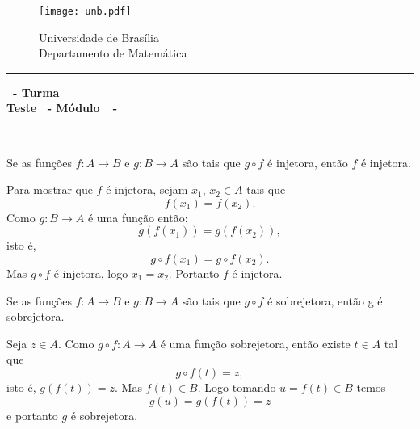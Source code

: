 \documentclass[12pt]{exam}
\begin{document}
    \begin{figure}[h]
        \begin{minipage}[c]{1.7cm}
            \texttt{[image: unb.pdf]}
        \end{minipage}
        \hspace{0pt}
        \begin{minipage}[c]{4in}
            {Universidade de Brasília} \\
            {Departamento de Matemática}
        \end{minipage}
    \end{figure}
    \hrule
    \begin{center}
        {\Large\bf \disciplina\ - Turma \turma}  \\
         {\large\bf Teste \numeroteste\ - Módulo\ \modulo\ -\ \dataavaliacao}
    \end{center}

    \\
    \vspace*{.01cm}

    \vspace{.4cm}

    \questao Se as funções $f : A \to B$ e $g : B\to A$ são
    tais que $g\circ f$ é injetora, então $f$ é injetora.

    \noindent\solucao Para mostrar que $f$ é injetora, sejam $x_1$, $x_2 \in A$ tais que
    \[
        f(x_1) = f(x_2).
    \]
    Como $g : B \to A$ é uma função então:
    \[
        g(f(x_1)) = g(f(x_2)),
    \]
    isto é,
    \[
        g \circ f(x_1) = g \circ f(x_2).
    \]
    Mas $g \circ f$ é injetora, logo $x_1 = x_2$. Portanto $f$ é injetora.

    \vspace*{1cm}

    \questao{} Se as funções $f : A \to B$ e $g : B\to A$ são
    tais que $g\circ f$ é sobrejetora, então g é sobrejetora.

    \noindent\solucao Seja $z \in A$. Como $g \circ f : A \to A$ é uma função
    sobrejetora, então existe $t \in A$ tal que
    \[
        g \circ f(t) = z,
    \]
    isto é, $g(f(t)) = z$. Mas $f(t) \in B$. Logo tomando $u = f(t) \in B$ temos
    \[
        g(u) = g(f(t)) = z
    \]
    e portanto $g$ é sobrejetora.


    \vspace{1cm}
\end{document}
